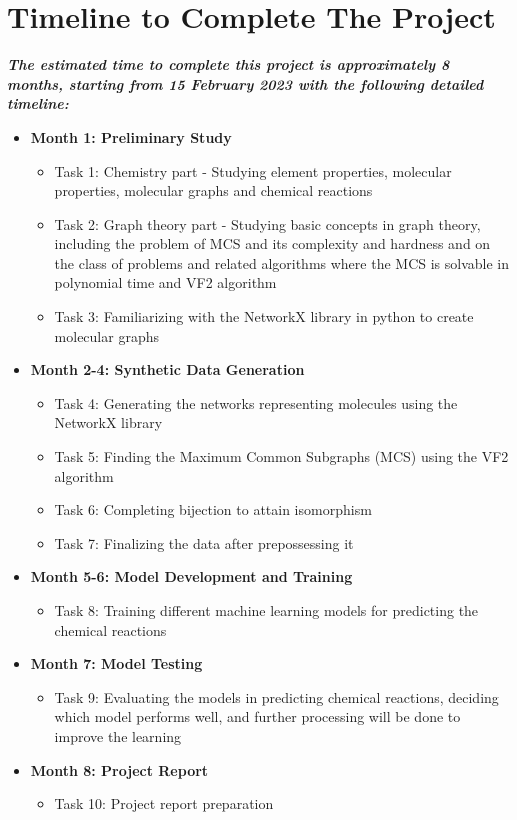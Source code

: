 \documentclass{article}
\begin{document}
\section*{Timeline to Complete The Project}
\textbf{\textit{The estimated time to complete this project is approximately 8 months, starting from 15 February 2023 with the following detailed timeline:}}
\begin{itemize}
	\item {\textbf{Month 1: Preliminary Study}}
	\begin{itemize}
		\item Task 1: Chemistry part - Studying element properties, molecular properties, molecular graphs and chemical reactions  
		\item Task 2: Graph theory part - Studying basic concepts in graph theory, including the problem of MCS and its complexity and  hardness and on the class of problems and related algorithms where the MCS is solvable in polynomial time and VF2 algorithm
            \item Task 3: Familiarizing with the NetworkX library in python to create molecular graphs
	\end{itemize}
	\item {\textbf{Month 2-4: Synthetic Data Generation}}
	\begin{itemize}
		\item Task 4: Generating the networks representing molecules using the NetworkX library
  		\item Task 5: Finding the Maximum Common Subgraphs (MCS) using the VF2 algorithm
		\item Task 6: Completing bijection to attain isomorphism
		\item Task 7: Finalizing the data after prepossessing it
	\end{itemize}
	\item {\textbf{Month 5-6: Model Development and Training}}
	\begin{itemize}
		\item Task 8: Training different machine learning models for predicting the chemical reactions
  	\end{itemize}
        \item {\textbf{Month 7: Model Testing}}
        \begin{itemize}
		\item Task 9: Evaluating the models in predicting chemical reactions, deciding which model performs well, and further processing will be done to improve the learning
	\end{itemize}
	\item {\textbf{Month 8: Project Report}}
	\begin{itemize}
		\item Task 10: Project report preparation
	\end{itemize}
\end{itemize}
\end{document}
